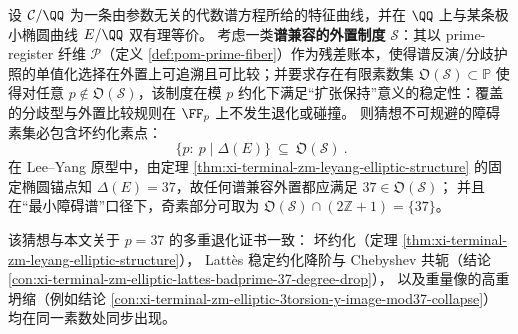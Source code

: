 \begin{conjecture}\label{conj:xi-terminal-zm-spectral-compatible-externalization-badprime-minimal}
设 \(\mathcal C/\QQ\) 为一条由参数无关的代数谱方程所给的特征曲线，并在 \(\QQ\) 上与某条极小椭圆曲线 \(E/\QQ\) 双有理等价。
考虑一类\textbf{谱兼容的外置制度} \(\mathcal S\)：其以 prime-register 纤维 \(\mathcal P\)（定义 \ref{def:pom-prime-fiber}）作为残差账本，使得谱反演/分歧护照的单值化选择在外置上可追溯且可比较；并要求存在有限素数集
\(\mathfrak O(\mathcal S)\subset\mathbb{P}\)
使得对任意 \(p\notin\mathfrak O(\mathcal S)\)，该制度在模 \(p\) 约化下满足“扩张保持”意义的稳定性：覆盖的分歧型与外置比较规则在 \(\FF_p\) 上不发生退化或碰撞。
则猜想不可规避的障碍素集必包含坏约化素点：
\[
\boxed{\ \{p:\ p\mid \Delta(E)\}\ \subseteq\ \mathfrak O(\mathcal S)\ }.
\]
在 Lee--Yang 原型中，由定理 \ref{thm:xi-terminal-zm-leyang-elliptic-structure} 的固定椭圆锚点知 \(\Delta(E)=37\)，故任何谱兼容外置都应满足 \(37\in\mathfrak O(\mathcal S)\)；
并且在“最小障碍谱”口径下，奇素部分可取为 \(\mathfrak O(\mathcal S)\cap(2\mathbb{Z}+1)=\{37\}\)。
\end{conjecture}
\begin{remark}
该猜想与本文关于 \(p=37\) 的多重退化证书一致：
坏约化（定理 \ref{thm:xi-terminal-zm-leyang-elliptic-structure}），
Latt\`es 稳定约化降阶与 Chebyshev 共轭（结论 \ref{con:xi-terminal-zm-elliptic-lattes-badprime-37-degree-drop}），
以及重量像的高重坍缩（例如结论 \ref{con:xi-terminal-zm-elliptic-3torsion-y-image-mod37-collapse}）
均在同一素数处同步出现。
\end{remark}

\endinput
